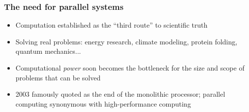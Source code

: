 \documentclass[10pt]{beamer}
\begin{document}
\begin{frame}
\frametitle{The need for parallel systems}
\pause
\begin{itemize}[<+->]
    \item Computation established as the ``third route''
        to scientific truth
    \item Solving real problems:
        energy research,
        climate modeling,
        protein folding,
        quantum mechanics...
    \item Computational \emph{power} soon becomes
        the bottleneck for the size and scope of
        problems that can be solved
    \item 2003 famously quoted as the end
        of the monolithic processor;
        parallel computing synonymous with
        high-performance computing
\end{itemize}
\end{frame}
\end{document}
